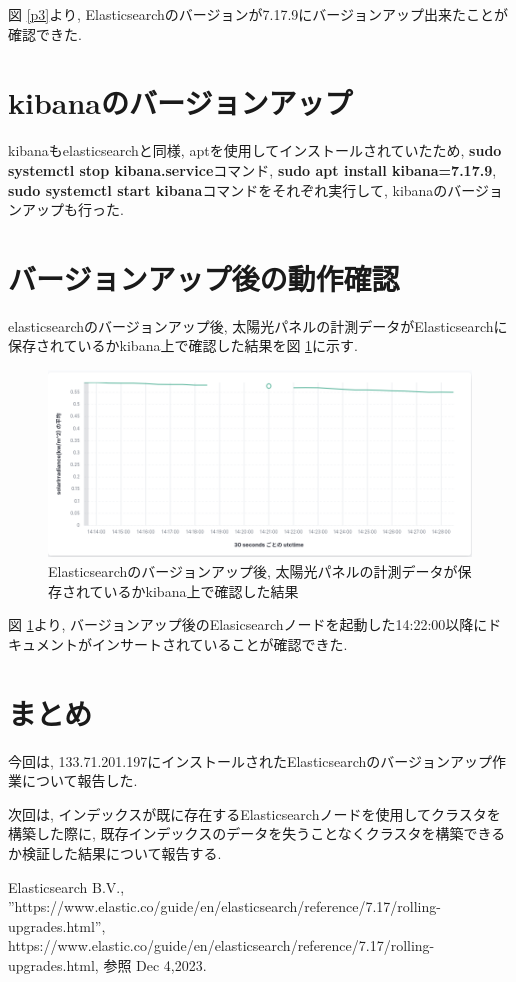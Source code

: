 \documentclass[a4j,12pt,]{jarticle}
\begin{document}
図 \ref{p3}より, Elasticsearchのバージョンが7.17.9にバージョンアップ出来たことが確認できた.

\section{kibanaのバージョンアップ}

kibanaもelasticsearchと同様, aptを使用してインストールされていたため, \textbf{sudo systemctl stop kibana.service}コマンド, \textbf{sudo apt install kibana=7.17.9}, \textbf{sudo systemctl start kibana}コマンドをそれぞれ実行して, kibanaのバージョンアップも行った.

\section{バージョンアップ後の動作確認}

elasticsearchのバージョンアップ後, 太陽光パネルの計測データがElasticsearchに保存されているかkibana上で確認した結果を図 \ref{p4}に示す.

\begin{figure}[H]
  \begin{center}
    \includegraphics[width=160mm]{downtime.png}
    \caption{Elasticsearchのバージョンアップ後, 太陽光パネルの計測データが保存されているかkibana上で確認した結果}
    \label{p4}
  \end{center}
\end{figure}

図 \ref{p4}より, バージョンアップ後のElasicsearchノードを起動した14:22:00以降にドキュメントがインサートされていることが確認できた.

\section{まとめ}
今回は, 133.71.201.197にインストールされたElasticsearchのバージョンアップ作業について報告した.

次回は, インデックスが既に存在するElasticsearchノードを使用してクラスタを構築した際に, 既存インデックスのデータを失うことなくクラスタを構築できるか検証した結果について報告する.

\begin{thebibliography}{5}
  Elasticsearch B.V.,\\ ”https://www.elastic.co/guide/en/elasticsearch/reference/7.17/rolling-upgrades.html”, https://www.elastic.co/guide/en/elasticsearch/reference/7.17/rolling-upgrades.html, 参照 Dec 4,2023.
\end{thebibliography}
\end{document}
